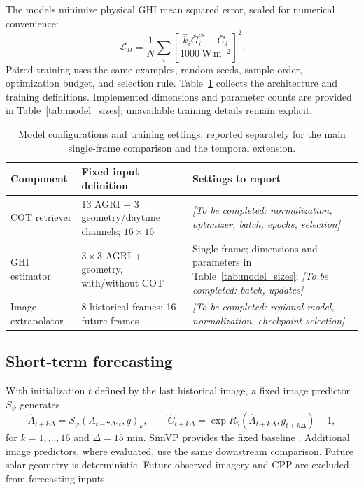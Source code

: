 \documentclass[11pt]{article}
\newcommand{\pending}[1]{{\color{pendingcolor}\textit{[To be completed: #1]}}}
\begin{document}
The models minimize physical GHI mean squared error, scaled for numerical convenience:
\begin{equation}
\mathcal L_H=\frac1N\sum_i\left[\frac{\widehat k_i\bar G^{cs}_i-\bar G_i}{1000\ \mathrm{W\,m^{-2}}}\right]^2.
\label{eq:ghi-loss}
\end{equation}
Paired training uses the same examples, random seeds, sample order, optimization budget, and selection rule. Table~\ref{tab:training} collects the architecture and training definitions. Implemented dimensions and parameter counts are provided in Table~\ref{tab:model_sizes}; unavailable training details remain explicit.
\begin{table}[!htbp]\centering\small
\caption{Model configurations and training settings, reported separately for the main single-frame comparison and the temporal extension.}\label{tab:training}
\begin{tabularx}{\linewidth}{lXX}\toprule
Component & Fixed input definition & Settings to report\\\midrule
COT retriever & 13 AGRI + 3 geometry/daytime channels; $16\times16$ & \pending{normalization, optimizer, batch, epochs, selection}\\
GHI estimator & $3\times3$ AGRI + geometry, with/without COT & Single frame; dimensions and parameters in Table~\ref{tab:model_sizes}; \pending{batch, updates}\\
Image extrapolator & 8 historical frames; 16 future frames & \pending{regional model, normalization, checkpoint selection}\\\bottomrule
\end{tabularx}\end{table}

\FloatBarrier
\subsection{Short-term forecasting}
With initialization $t$ defined by the last historical image, a fixed image predictor $S_\psi$ generates
\begin{equation}
\widehat A_{t+k\Delta}=S_\psi(A_{t-7\Delta:t},g)_{k},\qquad
\widehat C_{t+k\Delta}=\exp R_\theta(\widehat A_{t+k\Delta},g_{t+k\Delta})-1,
\label{eq:forecast}
\end{equation}
for $k=1,\ldots,16$ and $\Delta=15$ min. SimVP provides the fixed baseline \cite{simvp,simvpv2}. Additional image predictors, where evaluated, use the same downstream comparison. Future solar geometry is deterministic. Future observed imagery and CPP are excluded from forecasting inputs.
\end{document}
